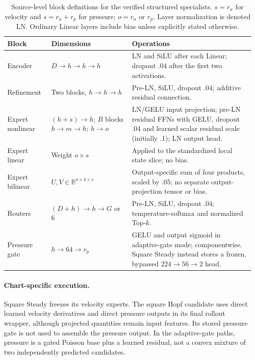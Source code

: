\begin{table}[htbp]
\centering\small
\setlength{\tabcolsep}{4pt}
\caption{Source-level block definitions for the verified structured specialists.
$s=r_u$ for velocity and $s=r_u+r_p$ for pressure; $o=r_u$ or $r_p$.
Layer normalization is denoted LN. Ordinary Linear layers include bias unless
explicitly stated otherwise.}
\label{tab:audit_network_blocks}
\begin{tabular}{@{}>{\raggedright\arraybackslash}p{2.0cm}
>{\raggedright\arraybackslash}p{4.6cm}
>{\raggedright\arraybackslash}p{6.0cm}@{}}
\toprule
Block & Dimensions & Operations \\
\midrule
Encoder & $D\to h\to h\to h$ & LN and SiLU after each Linear; dropout .04 after the first two activations. \\
\addlinespace
Refinement & Two blocks, $h\to h\to h$ & Pre-LN, SiLU, dropout .04; additive residual connection. \\
\addlinespace
Expert nonlinear & $(h+s)\to h$; $B$ blocks $h\to m\to h$; $h\to o$ & LN/GELU input projection; pre-LN residual FFNs with GELU, dropout .04 and learned scalar residual scale (initially .1); LN output head. \\
\addlinespace
Expert linear & Weight $o\times s$ & Applied to the standardized local state slice; no bias. \\
\addlinespace
Expert bilinear & $U,V\in\mathbb R^{o\times4\times s}$ & Output-specific sum of four products, scaled by .05; no separate output-projection tensor or bias. \\
\addlinespace
Routers & $(D+h)\to h\to G$ or $6$ & Pre-LN, SiLU, dropout .04; temperature-softmax and normalized Top-$k$. \\
\addlinespace
Pressure gate & $h\to64\to r_p$ & GELU and output sigmoid in adaptive-gate mode; componentwise. Square Steady instead stores a frozen, bypassed $224\to56\to2$ head. \\
\bottomrule
\end{tabular}
\end{table}

\paragraph{Chart-specific execution.}
Square Steady freezes its velocity experts. The square Hopf candidate uses
direct learned velocity derivatives and direct pressure outputs in its final
rollout wrapper, although projected quantities remain input features. Its
stored pressure gate is not used to assemble the pressure output. In the
adaptive-gate paths, pressure is a gated Poisson base plus a learned residual,
not a convex mixture of two independently predicted candidates.


